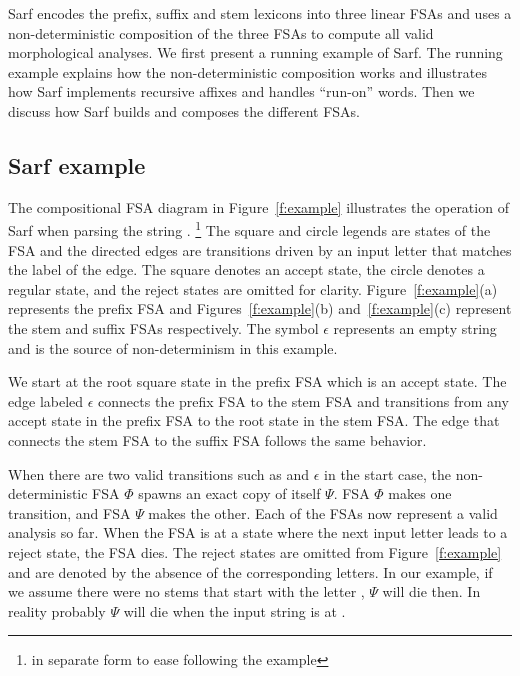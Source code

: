 \documentclass[11pt,letterpaper]{article}
\begin{document}
Sarf encodes the prefix, suffix and stem lexicons into 
three linear FSAs and uses a non-deterministic composition
of the three FSAs to compute all valid morphological analyses.
We first present a running example of Sarf. 
The running example explains
how the non-deterministic composition works and 
illustrates how Sarf implements recursive affixes and
handles ``run-on'' words.
Then we discuss how Sarf builds and composes the different FSAs.

\subsection{Sarf example}
\label{sec:example}

\begin{figure*}[tb]
\end{figure*}

The compositional FSA diagram in Figure~\ref{f:example}
illustrates the operation of Sarf when parsing the
string .
\footnote{ 
%
in separate form to ease following the example
}
The square and circle legends are states of the FSA
and the directed edges are transitions driven by an input
letter that matches the label of the edge. 
The square denotes an accept state, 
the circle denotes a regular state, and the reject states
are omitted for clarity. 
Figure~\ref{f:example}(a) represents the prefix FSA and 
Figures~\ref{f:example}(b) and~\ref{f:example}(c) represent the 
stem and suffix FSAs respectively. 
The symbol $\epsilon$ represents an empty string and is 
the source of non-determinism in this example. 

We start at the root square state in the prefix FSA
which is an accept state. 
The edge labeled $\epsilon$ connects the prefix 
FSA to the stem FSA and transitions from any accept state
in the prefix FSA to the root state in the stem FSA.
The edge that connects the stem FSA to the suffix FSA
follows the same behavior. 

When there are two valid transitions such as  
and $\epsilon$ in the start case, the non-deterministic 
FSA $\Phi$ spawns an exact copy of itself $\Psi$. FSA $\Phi$
makes one transition, and FSA $\Psi$ makes the other. 
Each of the FSAs now represent a valid analysis so far. 
When the FSA is at a state where the next input letter
leads to a reject state, the FSA dies.
The reject states are omitted from Figure~\ref{f:example}
and are denoted by the absence of the corresponding 
letters. 
In our example, if we assume there were no stems that start 
with the letter , $\Psi$ will die then. 
In reality probably $\Psi$ will die when the input string
is at . 
\end{document}
